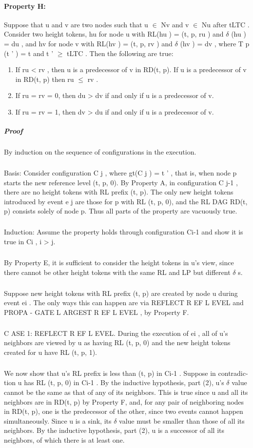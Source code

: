 \paragraph{Property H:} Suppose that u and v are two nodes such that u $\in$ Nv and v $\in$ Nu after tLTC . Consider two height tokens, hu for node u with RL(hu ) = (t, p, ru ) and $\delta$ (hu ) = du , and hv for node v with RL(hv ) = (t, p, rv ) and $\delta$ (hv ) = dv , where T p (t ' ) = t and t ' $\geq$ tLTC . Then the following are true:
\begin{enumerate}
	\item If ru < rv , then u is a predecessor of v in RD(t, p). If u is a predecessor of v in RD(t, p) then ru $\leq$ rv .
	\item If ru = rv = 0, then du > dv if and only if u is a predecessor of v.
	\item If ru = rv = 1, then dv > du if and only if u is a predecessor of v.
\end{enumerate}
\subparagraph{Proof} By induction on the sequence of configurations in the execution. 
\subparagraph{}Basis: Consider configuration C j , where gt(C j ) = t ' , that is, when node p starts the new reference level (t, p, 0). By Property A, in configuration C j-1 , there are no height tokens with RL prefix (t, p). The only new height tokens introduced by event e j are those for p with RL (t, p, 0), and the RL DAG RD(t, p) consists solely of node p. Thus all parts of the property are vacuously true.
\subparagraph{}Induction: Assume the property holds through configuration Ci-1 and show it is true in Ci , i > j.
\subparagraph{}By Property E, it is sufficient to consider the height tokens in u's view, since there cannot be other height tokens with the same RL and LP but different $\delta$ s.
\subparagraph{}Suppose new height tokens with RL prefix (t, p) are created by node u during event ei . The only ways this can happen are via REFLECT R EF L EVEL and PROPA - GATE L ARGEST R EF L EVEL , by Property F.
\subparagraph{}C ASE 1: REFLECT R EF L EVEL. During the execution of ei , all of u's neighbors are viewed by u as having RL (t, p, 0) and the new height tokens created for u have RL (t, p, 1).
\subparagraph{}We now show that u's RL prefix is less than (t, p) in Ci-1 . Suppose in contradic- tion u has RL (t, p, 0) in Ci-1 . By the inductive hypothesis, part (2), u's $\delta$ value cannot be the same as that of any of its neighbors. This is true since u and all its neighbors are in RD(t, p) by Property F, and, for any pair of neighboring nodes in RD(t, p), one is the predecessor of the other, since two events cannot happen simultaneously. Since u is a sink, its $\delta$ value must be smaller than those of all its neighbors. By the inductive hypothesis, part (2), u is a successor of all its neighbors, of which there is at least one.
